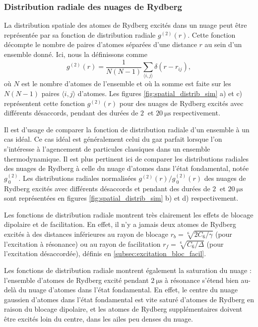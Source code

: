 \subsubsection*{Distribution radiale des nuages de Rydberg}
\noindent La distribution spatiale des atomes de Rydberg excités dans un nuage peut être représentée par sa fonction de distribution radiale $g^{(2)}(r)$.
Cette fonction décompte le nombre de paires d'atomes séparées d'une distance $r$ au sein d'un ensemble donné.
Ici, nous la définissons comme
\begin{equation}
\label{eq:g2r_def}
g^{(2)}(r) = \frac{1}{N(N-1)} \sum_{\langle i,j \rangle}{\delta (r-r_{ij})},
\end{equation}
où $N$ est le nombre d'atomes de l'ensemble et où la somme est faite sur les $N(N-1)$ paires $\langle i,j \rangle$ d'atomes.
Les figures \ref{fig:spatial_distrib_sim} a) et c) représentent cette fonction $g^{(2)}(r)$ pour des nuages de Rydberg excités avec différents désaccords, pendant des durées de $\SI{2}{}$ et $\SI{20}{\us}$ respectivement.

Il est d'usage de comparer la fonction de distribution radiale d'un ensemble à un cas idéal.
Ce cas idéal est généralement celui du gaz parfait lorsque l'on s'intéresse à l'agencement de particules classiques dans un ensemble thermodynamique.
Il est plus pertinent ici de comparer les distributions radiales des nuages de Rydberg à celle du nuage d'atomes dans l'état fondamental, notée $g^{(2)}_{~0}$.
Les distributions radiales normalisées $g^{(2)}(r)/g^{(2)}_{~0}(r)$ des nuages de Rydberg excités avec différents désaccords et pendant des durées de $\SI{2}{}$ et $\SI{20}{\us}$ sont représentées en figures \ref{fig:spatial_distrib_sim} b) et d) respectivement.

Les fonctions de distribution radiale montrent très clairement les effets de blocage dipolaire et de facilitation.
En effet, il n'y a jamais deux atomes de Rydberg excités à des distances inférieures au rayon de blocage $r_b=\sqrt[6]{2C_6/\gamma}$ (pour l'excitation à résonance) ou au rayon de facilitation $r_f=\sqrt[6]{C_6/\Delta}$ (pour l'excitation désaccordée), définis en \ref{subsec:excitation_bloc_facil}.

Les fonctions de distribution radiale montrent également la saturation du nuage : l'ensemble d'atomes de Rydberg excité pendant $\SI{2}{\us}$ à résonance s'étend bien au-delà du nuage d'atomes dans l'état fondamental.
En effet, le centre du nuage gaussien d'atomes dans l'état fondamental est vite saturé d'atomes de Rydberg en raison du blocage dipolaire, et les atomes de Rydberg supplémentaires doivent être excités loin du centre, dans les ailes peu denses du nuage.

